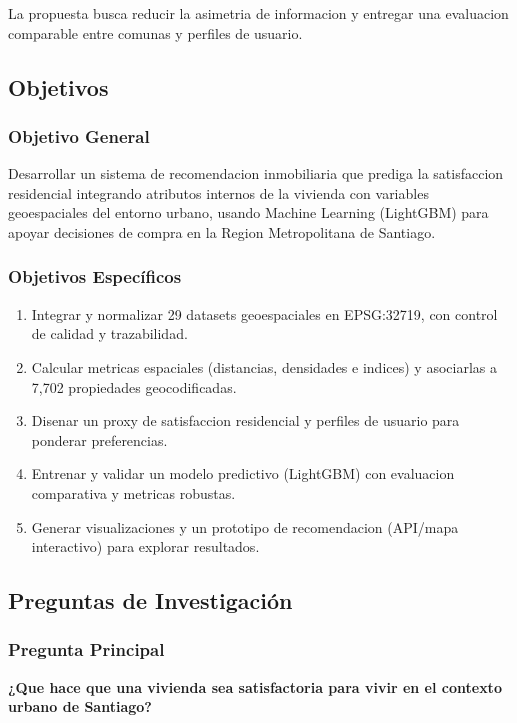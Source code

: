 \documentclass[11pt,letterpaper]{article}
\begin{document}
La propuesta busca reducir la asimetria de informacion y entregar una evaluacion comparable entre comunas y perfiles de usuario.

\subsection{Objetivos}

\subsubsection{Objetivo General}
Desarrollar un sistema de recomendacion inmobiliaria que prediga la satisfaccion residencial integrando atributos internos de la vivienda con variables geoespaciales del entorno urbano, usando Machine Learning (LightGBM) para apoyar decisiones de compra en la Region Metropolitana de Santiago.

\subsubsection{Objetivos Específicos}
\begin{enumerate}
    \item Integrar y normalizar 29 datasets geoespaciales en EPSG:32719, con control de calidad y trazabilidad.
    \item Calcular metricas espaciales (distancias, densidades e indices) y asociarlas a 7,702 propiedades geocodificadas.
    \item Disenar un proxy de satisfaccion residencial y perfiles de usuario para ponderar preferencias.
    \item Entrenar y validar un modelo predictivo (LightGBM) con evaluacion comparativa y metricas robustas.
    \item Generar visualizaciones y un prototipo de recomendacion (API/mapa interactivo) para explorar resultados.
\end{enumerate}

\subsection{Preguntas de Investigación}

\subsubsection{Pregunta Principal}
\textbf{¿Que hace que una vivienda sea satisfactoria para vivir en el contexto urbano de Santiago?}
\end{document}
